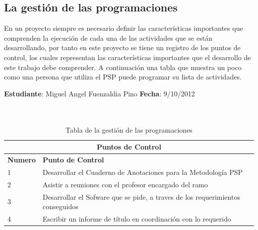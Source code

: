 \documentclass[a4paper,12pt,openany,oneside]{book}
\begin{document}
\subsection{La gestión de las programaciones}
En un proyecto siempre es necesario definir las características importantes que comprenden la ejecución de cada una de las actividades que se están desarrollando, por tanto en este proyecto se tiene un registro de los puntos de control, los cuales representan las características importantes que el desarrollo de este trabajo debe comprender. A continuación una tabla que muestra un poco como una persona que utiliza el PSP puede programar su lista de actividades.
\begin{table}[!ht]
\textbf{Estudiante}: Miguel Angel Fuenzaldia Pino     \textbf{Fecha}: 9/10/2012\\\\\
\begin{tabular}{| l | l |}
\hline
\multicolumn{2}{|c|}{\textbf{Puntos de Control}}\\
\hline
\textbf{Numero} & \textbf{Punto de Control}\\
\hline
1 & Desarrollar el Cuaderno de Anotaciones para la Metodología PSP \\
\hline
2 & Asistir a reuniones con el profesor encargado del ramo \\
\hline
3 & Desarrollar el Sofware que se pide, a traves de los requerimientos conseguidos \\
\hline
4 & Escribir un informe de título en coordinación con lo requerido\\
\hline
\end{tabular}
\caption{Tabla de la gestión de las programaciones}
\end{table}
\end{document}
